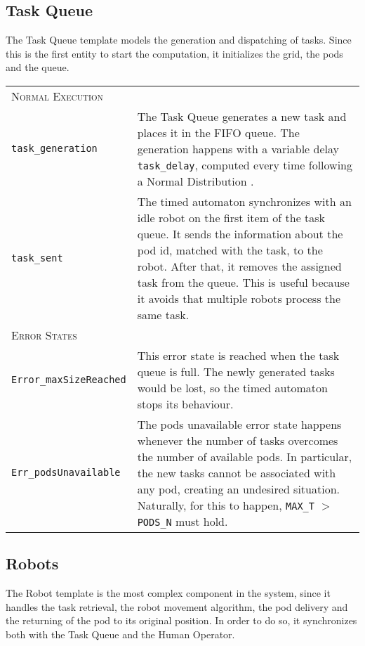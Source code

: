 \subsection{Task Queue}
The Task Queue template models the generation and dispatching of tasks. Since this is the first entity to start the computation, it initializes the grid, the pods and the queue. 

\begin{tabularx}{\textwidth}{lX}
\multicolumn{2}{l}{{\scshape Normal Execution}}
 \vspace{0,2cm}\\
\texttt{task\_generation} & The Task Queue generates a new task and places it in the FIFO queue. The generation happens with a variable delay \texttt{task\_delay}, computed every time following a Normal Distribution \cite{David2015}. \vspace{0,2cm}\\
\texttt{task\_sent} & The timed automaton synchronizes with an idle robot on the first item of the task queue. It sends the information about the pod id, matched with the task, to the robot. After that, it removes the assigned task from the queue. This is useful because it avoids that multiple robots process the same task. \vspace{0,4cm}\\
\multicolumn{2}{l}{{\scshape Error States}} \vspace{0,2cm}\\
\texttt{Error\_maxSizeReached}  & This error state is reached when the task queue is full. The newly generated tasks would be lost, so the timed automaton stops its behaviour. \vspace{0,2cm}\\
\texttt{Err\_podsUnavailable}   & The pods unavailable error state happens whenever the number of tasks overcomes the number of available pods. In particular, the new tasks cannot be associated with any pod, creating an undesired situation. Naturally, for this to happen, \texttt{MAX\_T} $>$ \texttt{PODS\_N} must hold. \vspace{0,2cm}\\
\end{tabularx}

\subsection{Robots}
The Robot template is the most complex component in the system, since it handles the task retrieval, the robot movement algorithm, the pod delivery and the returning of the pod to its original position.
In order to do so, it synchronizes both with the Task Queue and the Human Operator. 

